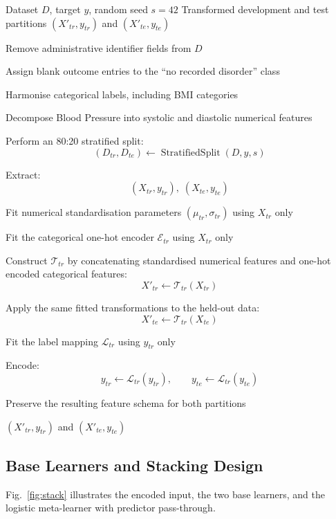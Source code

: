 \documentclass[a4paper,fleqn]{cas-dc}
\begin{document}
\begin{algorithm}[tbp]
\caption{Leakage-Controlled Data Preparation and Feature Transformation}
\label{alg:prep}
\small
\setlength{\abovedisplayskip}{3pt}
\setlength{\belowdisplayskip}{3pt}
\begin{algorithmic}[1]

\Require Dataset $D$, target $y$, random seed $s=42$
\Ensure Transformed development and test partitions
$(X'_{tr},y_{tr})$ and $(X'_{te},y_{te})$

\State Remove administrative identifier fields from $D$

\State Assign blank outcome entries to the
``no recorded disorder'' class

\State Harmonise categorical labels, including BMI categories

\State Decompose Blood Pressure into systolic and
diastolic numerical features

\State Perform an 80:20 stratified split:
\[
(D_{tr},D_{te})\leftarrow
\operatorname{StratifiedSplit}(D,y,s)
\]

\State Extract:
\[
(X_{tr},y_{tr}),\;(X_{te},y_{te})
\]

\State Fit numerical standardisation parameters
$(\mu_{tr},\sigma_{tr})$ using $X_{tr}$ only

\State Fit the categorical one-hot encoder
$\mathcal{E}_{tr}$ using $X_{tr}$ only

\State Construct $\mathcal{T}_{tr}$ by concatenating standardised numerical features and one-hot encoded categorical features:
\[
X'_{tr}\leftarrow\mathcal{T}_{tr}(X_{tr})
\]

\State Apply the same fitted transformations to the
held-out data:
\[
X'_{te}
\leftarrow
\mathcal{T}_{tr}(X_{te})
\]

\State Fit the label mapping $\mathcal{L}_{tr}$ using
$y_{tr}$ only

\State Encode:
\[
y_{tr}\leftarrow\mathcal{L}_{tr}(y_{tr}),
\qquad
y_{te}\leftarrow\mathcal{L}_{tr}(y_{te})
\]

\State Preserve the resulting feature schema for both partitions

\State \Return
$(X'_{tr},y_{tr})$ and $(X'_{te},y_{te})$

\end{algorithmic}
\end{algorithm}

\subsection{Base Learners and Stacking Design}
\label{sec:architecture}
Fig.~\ref{fig:stack} illustrates the encoded input, the two base learners, and the logistic meta-learner with predictor pass-through.
\end{document}
